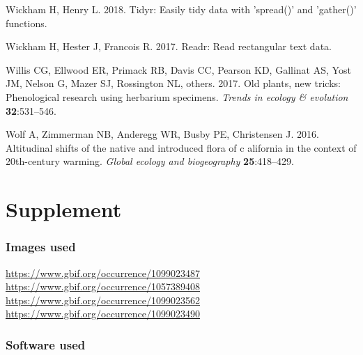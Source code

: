 \documentclass[man,floatsintext]{apa6}
\theoremstyle{definition}
\theoremstyle{definition}
\theoremstyle{definition}
\theoremstyle{remark}
\begin{document}
\leavevmode\hypertarget{ref-R-tidyr}{}%
Wickham H, Henry L. 2018. Tidyr: Easily tidy data with 'spread()' and
'gather()' functions.

\leavevmode\hypertarget{ref-R-readr}{}%
Wickham H, Hester J, Francois R. 2017. Readr: Read rectangular text
data.

\leavevmode\hypertarget{ref-willis2017old}{}%
Willis CG, Ellwood ER, Primack RB, Davis CC, Pearson KD, Gallinat AS,
Yost JM, Nelson G, Mazer SJ, Rossington NL, others. 2017. Old plants,
new tricks: Phenological research using herbarium specimens.
\emph{Trends in ecology \& evolution} \textbf{32}:531--546.

\leavevmode\hypertarget{ref-wolf2016altitudinal}{}%
Wolf A, Zimmerman NB, Anderegg WR, Busby PE, Christensen J. 2016.
Altitudinal shifts of the native and introduced flora of c alifornia in
the context of 20th-century warming. \emph{Global ecology and
biogeography} \textbf{25}:418--429.

\endgroup

\newpage
\setcounter{table}{0}  \renewcommand{\thetable}{S\arabic{table}} \setcounter{figure}{0} \renewcommand{\thefigure}{S\arabic{figure}}

\hypertarget{supplement}{%
\section{Supplement}\label{supplement}}

\hypertarget{images-used}{%
\subsubsection{Images used}\label{images-used}}

\url{https://www.gbif.org/occurrence/1099023487}
\url{https://www.gbif.org/occurrence/1057389408}
\url{https://www.gbif.org/occurrence/1099023562}
\url{https://www.gbif.org/occurrence/1099023490}

\hypertarget{software-used}{%
\subsubsection{Software used}\label{software-used}}
\end{document}
